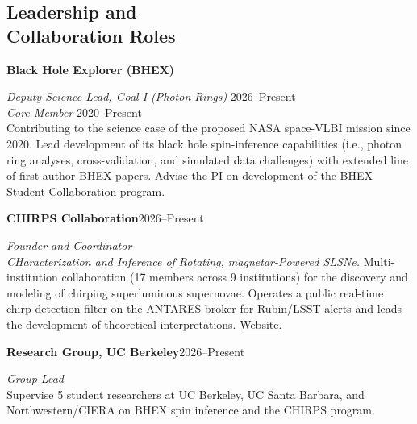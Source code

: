 \documentclass[margin,line]{res}
\begin{document}
\begin{resume}




\vspace{+.2cm}
\section{\sc Leadership and \\ Collaboration Roles}
 
{\bf Black Hole Explorer (BHEX)}
 
\vspace{-.4cm}
{\em Deputy Science Lead, Goal I (Photon Rings)} \hfill 2026--Present\\ 
{\em Core Member} \hfill 2020--Present\\
{\color{gray} Contributing to the science case of the proposed NASA space-VLBI mission since 2020. Lead development of its black hole spin-inference capabilities (i.e., photon ring analyses, cross-validation, and simulated data challenges) with extended line of first-author BHEX papers. Advise the PI on development of the BHEX Student Collaboration program.}
 
\vspace*{-2mm}
{\bf CHIRPS Collaboration}\hfill 2026--Present
 
\vspace{-.4cm}
{\em Founder and Coordinator}\\
{\color{gray} \textit{CHaracterization and Inference of Rotating, magnetar-Powered SLSNe.} Multi-institution collaboration (17 members across 9 institutions) for the discovery and modeling of chirping superluminous supernovae. Operates a public real-time chirp-detection filter on the ANTARES broker for Rubin/LSST alerts and leads the development of theoretical interpretations. {\color{blue}\href{https://chirps.space}{Website.}}} 
 
\vspace*{-2mm}
{\bf Research Group, UC Berkeley}\hfill 2026--Present
 
\vspace{-.4cm}
{\em Group Lead}\\
{\color{gray} Supervise 5 student researchers at UC Berkeley, UC Santa Barbara, and Northwestern/CIERA on BHEX spin inference and the CHIRPS program.} %
 

\end{resume}
\end{document}
